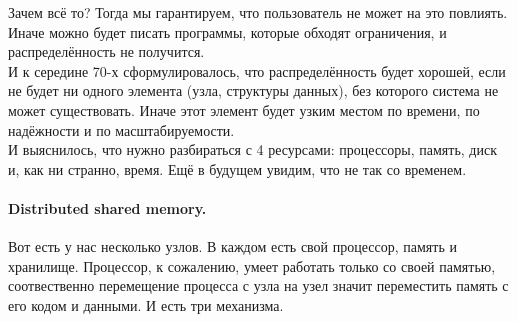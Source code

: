 \documentclass{article}
\begin{document}
    Зачем всё то? Тогда мы гарантируем, что пользователь не может на это повлиять. Иначе можно будет писать программы, которые обходят ограничения, и распределённость не получится.\\
    И к середине 70-х сформулировалось, что распределённость будет хорошей, если не будет ни одного элемента (узла, структуры данных), без которого система не может существовать. Иначе этот элемент будет узким местом по времени, по надёжности и по масштабируемости.\\
    И выяснилось, что нужно разбираться с 4 ресурсами: процессоры, память, диск и, как ни странно, время. Ещё в будущем увидим, что не так со временем. 
    \paragraph{Distributed shared memory.}
    Вот есть у нас несколько узлов. В каждом есть свой процессор, память и хранилище. Процессор, к сожалению, умеет работать только со своей памятью, соотвественно перемещение процесса с узла на узел значит переместить память с его кодом и данными. И есть три механизма.
\end{document}
